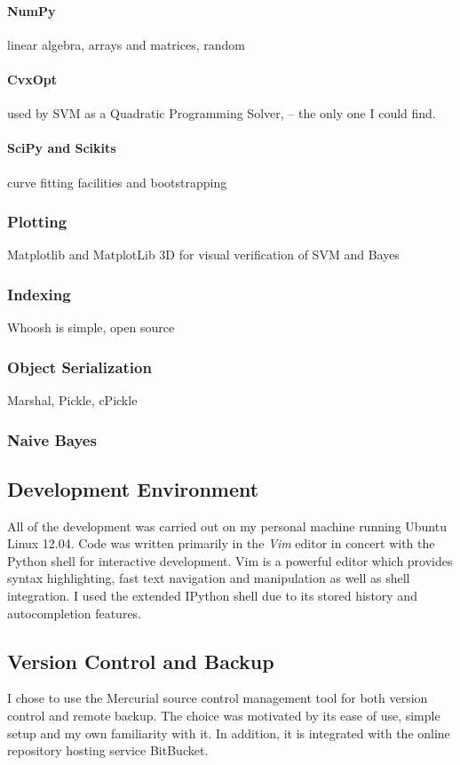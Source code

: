 \documentclass[12pt,notitlepage,twoside]{scrreprt}
\begin{document}
\paragraph{NumPy} linear algebra, arrays and matrices, random
\paragraph{CvxOpt}
used by SVM as a  Quadratic Programming Solver, -- the only one I could find.
\paragraph{SciPy and Scikits} curve fitting facilities and bootstrapping
\subsubsection*{Plotting}
Matplotlib and MatplotLib 3D for visual verification of SVM and Bayes
\subsubsection*{Indexing}
Whoosh is simple, open source

\subsubsection*{Object Serialization}
Marshal, Pickle, cPickle
\subsubsection*{Naive Bayes}

\subsection{Development Environment}
All of the development was carried out on my personal machine running Ubuntu Linux 12.04.
Code was written primarily in the \textit{Vim} editor in concert with the Python shell for
interactive development. Vim is a powerful editor which provides syntax highlighting, fast
text navigation and manipulation as well as shell integration. I used the extended IPython
shell due to its stored history and autocompletion features.

\subsection{Version Control and Backup}
I chose to use the Mercurial source control management tool for both version control and
remote backup. The choice was motivated by its ease of use, simple setup and my own
familiarity with it. In addition, it is integrated with the online repository hosting
service BitBucket. 
\end{document}
